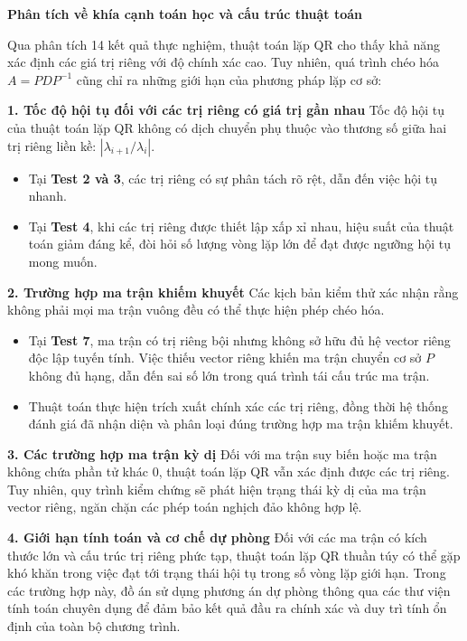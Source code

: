 \textbf{Phân tích về khía cạnh toán học và cấu trúc thuật toán}

Qua phân tích 14 kết quả thực nghiệm, thuật toán lặp QR cho thấy khả năng xác định các giá trị riêng với độ chính xác cao. Tuy nhiên, quá trình chéo hóa $A = P D P^{-1}$ cũng chỉ ra những giới hạn của phương pháp lặp cơ sở:

\textbf{1. Tốc độ hội tụ đối với các trị riêng có giá trị gần nhau}
Tốc độ hội tụ của thuật toán lặp QR không có dịch chuyển phụ thuộc vào thương số giữa hai trị riêng liền kề: $|\lambda_{i+1} / \lambda_i|$. 
\begin{itemize}
    \item Tại \textbf{Test 2 và 3}, các trị riêng có sự phân tách rõ rệt, dẫn đến việc hội tụ nhanh.
    \item Tại \textbf{Test 4}, khi các trị riêng được thiết lập xấp xỉ nhau, hiệu suất của thuật toán giảm đáng kể, đòi hỏi số lượng vòng lặp lớn để đạt được ngưỡng hội tụ mong muốn.
\end{itemize}

\textbf{2. Trường hợp ma trận khiếm khuyết}
Các kịch bản kiểm thử xác nhận rằng không phải mọi ma trận vuông đều có thể thực hiện phép chéo hóa. 
\begin{itemize}
    \item Tại \textbf{Test 7}, ma trận 
có trị riêng bội nhưng không sở hữu đủ hệ vector riêng độc lập tuyến tính. Việc thiếu vector riêng khiến ma trận chuyển cơ sở $P$ không đủ hạng, dẫn đến sai số lớn trong quá trình tái cấu trúc ma trận.
    \item Thuật toán thực hiện trích xuất chính xác các trị riêng, đồng thời hệ thống đánh giá đã nhận diện và phân loại đúng trường hợp ma trận khiếm khuyết.
\end{itemize}

\textbf{3. Các trường hợp ma trận kỳ dị}
Đối với ma trận suy biến hoặc ma trận không chứa phần tử khác 0, thuật toán lặp QR vẫn xác định được các trị riêng. Tuy nhiên, quy trình kiểm chứng sẽ phát hiện trạng thái kỳ dị của ma trận vector riêng, ngăn chặn các phép toán nghịch đảo không hợp lệ.

\textbf{4. Giới hạn tính toán và cơ chế dự phòng}
Đối với các ma trận có kích thước lớn và cấu trúc trị riêng phức tạp, thuật toán lặp QR thuần túy có thể gặp khó khăn trong việc đạt tới trạng thái hội tụ trong số vòng lặp giới hạn. Trong các trường hợp này, đồ án sử dụng phương án dự phòng thông qua các thư viện tính toán chuyên dụng để đảm bảo kết quả đầu ra chính xác và duy trì tính ổn định của toàn bộ chương trình.

